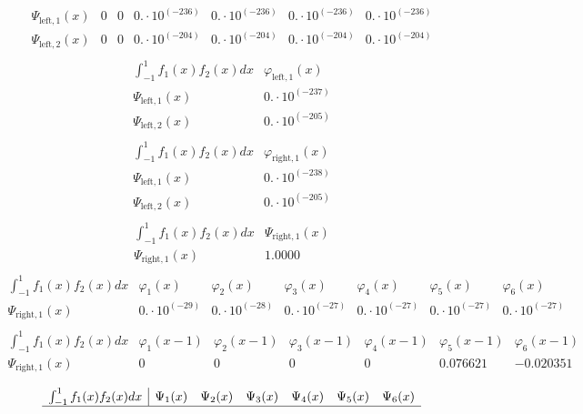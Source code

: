 \documentclass{article}
\begin{document}
\begin{landscape}
$$\begin{array}{l|llllll}
 \Psi_{\text{left},1}(x) & 0 & 0 & 0.\cdot 10^{(-236)} & 0.\cdot 10^{(-236)} & 0.\cdot 10^{(-236)} & 0.\cdot 10^{(-236)} \\ 
\Psi_{\text{left},2}(x) & 0 & 0 & 0.\cdot 10^{(-204)} & 0.\cdot 10^{(-204)} & 0.\cdot 10^{(-204)} & 0.\cdot 10^{(-204)} \\ 
\end{array} $$ 
$$ \begin{array}{l|l}
\int_{-1}^1 f_1(x)f_2(x) dx& \varphi_{\text{left},1}(x) \\ \hline 
 \Psi_{\text{left},1}(x) & 0.\cdot 10^{(-237)} \\ 
\Psi_{\text{left},2}(x) & 0.\cdot 10^{(-205)} \\ 
\end{array} $$ 
$$ \begin{array}{l|l}
\int_{-1}^1 f_1(x)f_2(x) dx& \varphi_{\text{right},1}(x) \\ \hline 
 \Psi_{\text{left},1}(x) & 0.\cdot 10^{(-238)} \\ 
\Psi_{\text{left},2}(x) & 0.\cdot 10^{(-205)} \\ 
\end{array} $$ 
$$ \begin{array}{l|l}
\int_{-1}^1 f_1(x)f_2(x) dx& \Psi_{\text{right},1}(x) \\ \hline 
 \Psi_{\text{right},1}(x) & 1.0000 \\ 
\end{array} $$
$$ \begin{array}{l|llllll}
\int_{-1}^1 f_1(x)f_2(x) dx& \varphi_1(x)& \varphi_2(x)& \varphi_3(x)& \varphi_4(x)& \varphi_5(x)& \varphi_6(x) \\ \hline 
 \Psi_{\text{right},1}(x) & 0.\cdot 10^{(-29)} & 0.\cdot 10^{(-28)} & 0.\cdot 10^{(-27)} & 0.\cdot 10^{(-27)} & 0.\cdot 10^{(-27)} & 0.\cdot 10^{(-27)} \\ 
\end{array} $$ 
$$ \begin{array}{l|llllll}
\int_{-1}^1 f_1(x)f_2(x) dx& \varphi_1(x-1)& \varphi_2(x-1)& \varphi_3(x-1)& \varphi_4(x-1)& \varphi_5(x-1)& \varphi_6(x-1) \\ \hline 
 \Psi_{\text{right},1}(x) & 0 & 0 & 0 & 0 & 0.076621 & -0.020351 \\ 
\end{array} $$ 
$$ \begin{array}{l|llllll}
\int_{-1}^1 f_1(x)f_2(x) dx& \Psi_1(x)& \Psi_2(x)& \Psi_3(x)& \Psi_4(x)& \Psi_5(x)& \Psi_6(x) \\ \hline 

\end{array}$$
\end{landscape}
\end{document}
